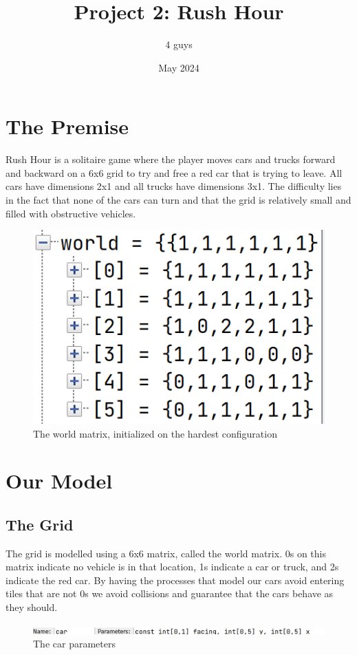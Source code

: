 \documentclass{article}
\title{Project 2: Rush Hour}
\author{4 guys}
\date{May 2024}
\begin{document}
\maketitle

\section{The Premise}
Rush Hour is a solitaire game where the player moves cars and trucks forward and backward on a 6x6 grid to try and free a red car that is trying to leave. All cars have dimensions 2x1 and all trucks have dimensions 3x1. The difficulty lies in the fact that none of the cars can turn and that the grid is relatively small and filled with obstructive vehicles.

\begin{figure}
    \centering
    \includegraphics[width=0.5\linewidth]{images/movematrix.png}
    \caption{The world matrix, initialized on the hardest configuration}
\end{figure}

\section{Our Model}
\subsection{The Grid}
The grid is modelled using a 6x6 matrix, called the world matrix. 0s on this matrix indicate no vehicle is in that location, 1s indicate a car or truck, and 2s indicate the red car. By having the processes that model our cars avoid entering tiles that are not 0s we avoid collisions and guarantee that the cars behave as they should.

\begin{figure}
    \centering
    \includegraphics[width=1\linewidth]{images/params.png}
    \caption{The car parameters}
\end{figure}
\end{document}
